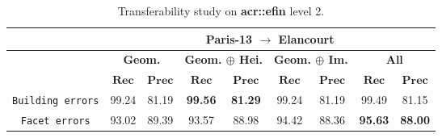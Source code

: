 \begin{table}[htbp]
\begin{tabular}{| c | c c | c c | c c | c c |}
                \hline
                \hline
                & \multicolumn{8}{c|}{\textbf{Paris-13 \(\rightarrow\) Elancourt}}\\
                \hline
                &\multicolumn{2}{c|}{\textbf{Geom.}} & \multicolumn{2}{c|}{\textbf{Geom. \(\oplus\) Hei.}} & \multicolumn{2}{c|}{\textbf{Geom. \(\oplus\) Im.}} & \multicolumn{2}{c|}{\textbf{All}} \\
                \cline{2-9}
                & \(\bm{Rec}\) & \(\bm{Prec}\) &  \(\bm{Rec}\) & \(\bm{Prec}\) &  \(\bm{Rec}\) & \(\bm{Prec}\) &  \(\bm{Rec}\) & \(\bm{Prec}\) \\
                \hline
                \texttt{Building errors} & 99.24 & 81.19 & \textbf{99.56} & \textbf{81.29} & 99.24 & 81.19 & 99.49 & 81.15 \\
                \hline
                \texttt{Facet errors} & 93.02 & 89.39 & 93.57 & 88.98 & 94.42 & 88.36 & \textbf{95.63} & \textbf{88.00} \\
                \hline
                \hline
            \end{tabular}
            \caption{\label{tab::transferability_f2} Transferability study on \textbf{\gls{acr::efin}} level 2.}
        \end{table}

